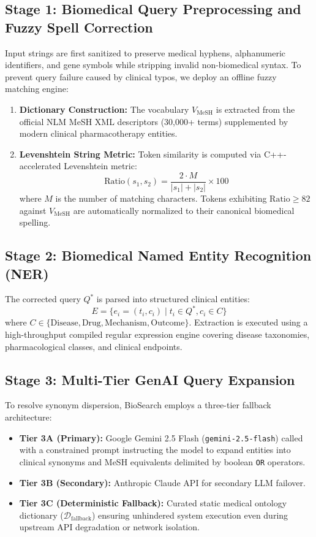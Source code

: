 \documentclass[conference]{IEEEtran}
\begin{document}
\subsection{Stage 1: Biomedical Query Preprocessing and Fuzzy Spell Correction}
Input strings are first sanitized to preserve medical hyphens, alphanumeric identifiers, and gene symbols while stripping invalid non-biomedical syntax. To prevent query failure caused by clinical typos, we deploy an offline fuzzy matching engine:
\begin{enumerate}
    \item \textbf{Dictionary Construction:} The vocabulary $V_{\text{MeSH}}$ is extracted from the official NLM MeSH XML descriptors (30,000+ terms) supplemented by modern clinical pharmacotherapy entities.
    \item \textbf{Levenshtein String Metric:} Token similarity is computed via C++-accelerated Levenshtein metric:
    \begin{equation}
    \text{Ratio}(s_1, s_2) = \frac{2 \cdot M}{|s_1| + |s_2|} \times 100
    \end{equation}
    where $M$ is the number of matching characters. Tokens exhibiting $\text{Ratio} \ge 82$ against $V_{\text{MeSH}}$ are automatically normalized to their canonical biomedical spelling.
\end{enumerate}

\subsection{Stage 2: Biomedical Named Entity Recognition (NER)}
The corrected query $Q^*$ is parsed into structured clinical entities:
\begin{equation}
E = \{e_i = (t_i, c_i) \mid t_i \in Q^*, c_i \in C\}
\end{equation}
where $C \in \{\text{Disease}, \text{Drug}, \text{Mechanism}, \text{Outcome}\}$. Extraction is executed using a high-throughput compiled regular expression engine covering disease taxonomies, pharmacological classes, and clinical endpoints.

\subsection{Stage 3: Multi-Tier GenAI Query Expansion}
To resolve synonym dispersion, BioSearch employs a three-tier fallback architecture:
\begin{itemize}
    \item \textbf{Tier 3A (Primary):} Google Gemini 2.5 Flash (\texttt{gemini-2.5-flash}) called with a constrained prompt instructing the model to expand entities into clinical synonyms and MeSH equivalents delimited by boolean \texttt{OR} operators.
    \item \textbf{Tier 3B (Secondary):} Anthropic Claude API for secondary LLM failover.
    \item \textbf{Tier 3C (Deterministic Fallback):} Curated static medical ontology dictionary ($\mathcal{D}_{\text{fallback}}$) ensuring unhindered system execution even during upstream API degradation or network isolation.
\end{itemize}
\end{document}
